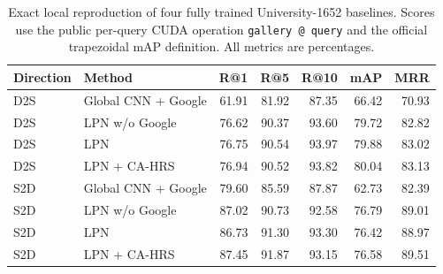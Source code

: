 \begin{table}[!t]
\centering
\small
\caption{Exact local reproduction of four fully trained University-1652 baselines. Scores use the public per-query CUDA operation \texttt{gallery @ query} and the official trapezoidal mAP definition. All metrics are percentages.}
\label{tab:formal-baseline-exact}
\begin{tabular}{llrrrrr}
\toprule
Direction & Method & R@1 & R@5 & R@10 & mAP & MRR \\
\midrule
D2S & Global CNN + Google & 61.91 & 81.92 & 87.35 & 66.42 & 70.93 \\
D2S & LPN w/o Google & 76.62 & 90.37 & 93.60 & 79.72 & 82.82 \\
D2S & LPN & 76.75 & 90.54 & 93.97 & 79.88 & 83.02 \\
D2S & LPN + CA-HRS & 76.94 & 90.52 & 93.82 & 80.04 & 83.13 \\
\midrule
S2D & Global CNN + Google & 79.60 & 85.59 & 87.87 & 62.73 & 82.39 \\
S2D & LPN w/o Google & 87.02 & 90.73 & 92.58 & 76.79 & 89.01 \\
S2D & LPN & 86.73 & 91.30 & 93.30 & 76.42 & 88.97 \\
S2D & LPN + CA-HRS & 87.45 & 91.87 & 93.15 & 76.58 & 89.51 \\
\bottomrule
\end{tabular}
\end{table}

